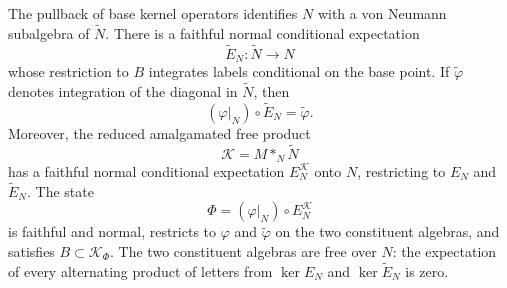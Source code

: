 \begin{lemma}
\label{lem:bernoulli-model}
The pullback of base kernel operators identifies $N$ with a von Neumann
subalgebra of $\widetilde N$. There is a faithful normal conditional
expectation
\[
 \widetilde E_N:\widetilde N\longrightarrow N
\]
whose restriction to $B$ integrates labels conditional on the base
point. If $\widetilde\varphi$ denotes integration of the diagonal in
$\widetilde N$, then
\[
 (\varphi|_N)\circ\widetilde E_N=\widetilde\varphi.
\]
Moreover, the reduced amalgamated free product
\[
 \mathcal K=M*_N\widetilde N
\]
has a faithful normal conditional expectation $E_N^{\mathcal K}$ onto
$N$, restricting to $E_N$ and $\widetilde E_N$. The state
\[
 \Phi=(\varphi|_N)\circ E_N^{\mathcal K}
\]
is faithful and normal, restricts to $\varphi$ and
$\widetilde\varphi$ on the two constituent algebras, and satisfies
$B\subset\mathcal K_\Phi$. The two constituent algebras are free over
$N$: the expectation of every alternating product of letters from
$\ker E_N$ and $\ker\widetilde E_N$ is zero.
\end{lemma}

